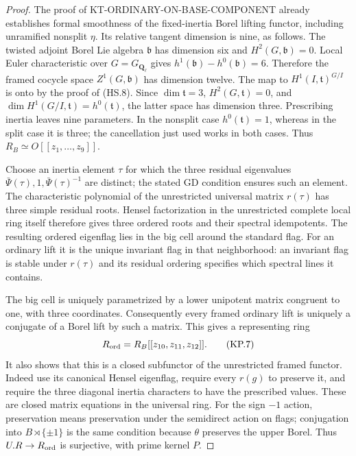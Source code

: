 \begin{proof}
The proof of KT-ORDINARY-ON-BASE-COMPONENT already establishes
formal smoothness of the fixed-inertia Borel lifting functor,
including unramified nonsplit $\eta$.  Its relative tangent
dimension is nine, as follows.  The twisted adjoint Borel Lie
algebra $\mathfrak b$ has dimension six and $H^2(G,\mathfrak b)=0$.
Local Euler characteristic over $G=G_{\mathbf Q_\ell}$ gives
$h^1(\mathfrak b)-h^0(\mathfrak b)=6$.  Therefore the framed
cocycle space $Z^1(G,\mathfrak b)$ has dimension twelve.
The map to $H^1(I,\mathfrak t)^{G/I}$ is onto by the proof of
(HS.8).  Since $\dim\mathfrak t=3$, $H^2(G,\mathfrak t)=0$,
and $\dim H^1(G/I,\mathfrak t)=h^0(\mathfrak t)$, the latter
space has dimension three.  Prescribing inertia leaves nine
parameters.  In the nonsplit case $h^0(\mathfrak t)=1$, whereas
in the split case it is three; the cancellation just used works
in both cases.  Thus $R_B\simeq O[[z_1,\ldots,z_9]]$.

Choose an inertia element $\tau$ for which the three residual
eigenvalues $\bar\Psi(\tau),1,\bar\Psi(\tau)^{-1}$ are distinct;
the stated GD condition ensures such an element.  The
characteristic polynomial of the unrestricted universal
matrix $r(\tau)$ has three simple residual roots.  Hensel
factorization in the unrestricted complete local ring itself
therefore gives three ordered roots and their spectral
idempotents.  The resulting ordered eigenflag lies in the big
cell around the standard flag.  For an ordinary lift it is the
unique invariant flag in that neighborhood: an invariant flag
is stable under $r(\tau)$ and its residual ordering specifies
which spectral lines it contains.

The big cell is uniquely parametrized by a lower unipotent
matrix congruent to one, with three coordinates.  Consequently
every framed ordinary lift is uniquely a conjugate of a Borel
lift by such a matrix.  This gives a representing ring
\[
              R_{\rm ord}=R_B[[z_{10},z_{11},z_{12}]].        \tag{KP.7}
\]
It also shows that this is a closed subfunctor of the
unrestricted framed functor.  Indeed use its canonical Hensel
eigenflag, require every $r(g)$ to preserve it, and require the
three diagonal inertia characters to have the prescribed
values.  These are closed matrix equations in the universal
ring.  For the sign $-1$ action, preservation means preservation
under the semidirect action on flags; conjugation into
$B\rtimes\{\pm1\}$ is the same condition because $\theta$
preserves the upper Borel.  Thus $U.R\to R_{\rm ord}$ is
surjective, with prime kernel $P$.


\end{proof}
